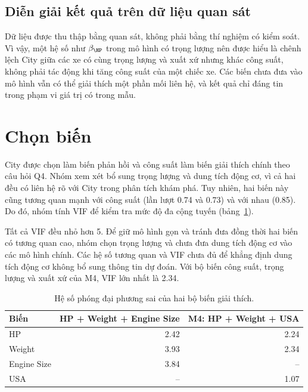 \documentclass[12pt,a4paper]{report}
\begin{document}
\subsection{Diễn giải kết quả trên dữ liệu quan sát}

Dữ liệu được thu thập bằng quan sát, không phải bằng thí nghiệm có kiểm soát.
Vì vậy, một hệ số như $\beta_{\HP}$ trong mô hình có trọng lượng nên được hiểu
là chênh lệch City giữa các xe có cùng trọng lượng và xuất xứ nhưng khác công
suất, không phải tác động khi tăng công suất của một chiếc xe. Các biến chưa
đưa vào mô hình vẫn có thể giải thích một phần mối liên hệ, và kết quả chỉ đáng
tin trong phạm vi giá trị có trong mẫu.

\section{Chọn biến}

City được chọn làm biến phản hồi và công suất làm biến giải thích chính theo
câu hỏi Q4. Nhóm xem xét bổ sung trọng lượng và dung tích động cơ, vì cả hai
đều có liên hệ rõ với City trong phân tích khám phá. Tuy nhiên, hai biến này
cũng tương quan mạnh với công suất (lần lượt \num{0.74} và \num{0.73}) và với
nhau (\num{0.85}). Do đó, nhóm tính VIF để kiểm tra mức độ đa cộng tuyến
(bảng~\ref{tab:vif}).

Tất cả VIF đều nhỏ hơn 5. Để giữ mô hình gọn và tránh đưa đồng thời hai biến có
tương quan cao, nhóm chọn trọng lượng và chưa đưa dung tích động cơ vào các mô
hình chính. Các hệ số tương quan và VIF chưa đủ để khẳng định dung tích động cơ
không bổ sung thông tin dự đoán. Với bộ biến công suất, trọng lượng và xuất xứ
của M4, VIF lớn nhất là \num{2.34}.

\begin{table}[tp]
  \centering
  \caption{Hệ số phóng đại phương sai của hai bộ biến giải thích.}
  \label{tab:vif}
  \begin{tabular}{lrr}
    \toprule
    Biến & HP + Weight + Engine Size & M4: HP + Weight + USA \\
    \midrule
    HP          & \num{2.42} & \num{2.24} \\
    Weight      & \num{3.93} & \num{2.34} \\
    Engine Size & \num{3.84} & -- \\
    USA         & --         & \num{1.07} \\
    \bottomrule
  \end{tabular}
\end{table}
\end{document}
